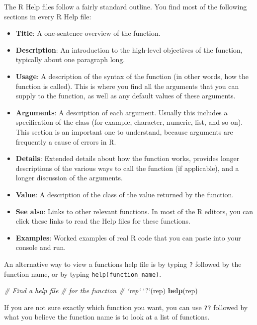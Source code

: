 \documentclass[
]{book}
\newenvironment{Shaded}{\begin{snugshade}}{\end{snugshade}}
\newcommand{\CommentTok}[1]{\textcolor[rgb]{0.56,0.35,0.01}{\textit{#1}}}
\newcommand{\DataTypeTok}[1]{\textcolor[rgb]{0.13,0.29,0.53}{#1}}
\newcommand{\KeywordTok}[1]{\textcolor[rgb]{0.13,0.29,0.53}{\textbf{#1}}}
\newcommand{\NormalTok}[1]{#1}
\newcommand{\StringTok}[1]{\textcolor[rgb]{0.31,0.60,0.02}{#1}}
\begin{document}
The R Help files follow a fairly standard outline. You find most of the following sections in every R Help file:

\begin{itemize}
\item
  \textbf{Title}: A one-sentence overview of the function.
\item
  \textbf{Description}: An introduction to the high-level objectives of the function, typically about one paragraph long.
\item
  \textbf{Usage}: A description of the syntax of the function (in other words, how the function is called). This is where you find all the arguments that you can supply to the function, as well as any default values of these arguments.
\item
  \textbf{Arguments}: A description of each argument. Usually this includes a specification of the class (for example, character, numeric, list, and so on). This section is an important one to understand, because arguments are frequently a cause of errors in R.
\item
  \textbf{Details}: Extended details about how the function works, provides longer descriptions of the various ways to call the function (if applicable), and a longer discussion of the arguments.
\item
  \textbf{Value}: A description of the class of the value returned by the function.
\item
  \textbf{See also}: Links to other relevant functions. In most of the R editors, you can click these links to read the Help files for these functions.
\item
  \textbf{Examples}: Worked examples of real R code that you can paste into your console and run.
\end{itemize}

An alternative way to view a functions help file is by typing \texttt{?} followed by the function name, or by typing \texttt{help(function\_name)}.

\begin{Shaded}
\begin{Highlighting}[]
\CommentTok{# Find a help file}
\CommentTok{# for the function}
\CommentTok{# `rep`}
\StringTok{`}\DataTypeTok{?}\StringTok{`}\NormalTok{(rep)}
\KeywordTok{help}\NormalTok{(rep)}
\end{Highlighting}
\end{Shaded}

If you are not sure exactly which function you want, you can use \texttt{??} followed by what you believe the function name is to look at a list of functions.
\end{document}
